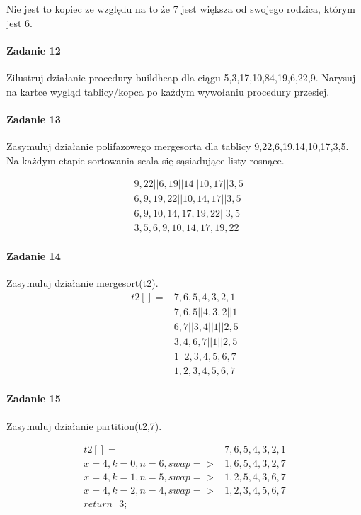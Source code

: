 \documentclass[18pt]{extarticle}
\begin{document}
Nie jest to kopiec ze względu na to że 7 jest większa od swojego rodzica, którym jest 6. \\ 

\paragraph{Zadanie 12} Zilustruj działanie procedury buildheap dla ciągu {5,3,17,10,84,19,6,22,9}. Narysuj na kartce wygląd tablicy/kopca po każdym wywołaniu procedury przesiej.

\paragraph{Zadanie 13} Zasymuluj działanie polifazowego mergesorta dla tablicy {9,22,6,19,14,10,17,3,5}. Na każdym etapie sortowania scala się sąsiadujące listy rosnące.


\begin{align*}
    &{9,22 || 6,19 || 14 || 10,17 || 3,5} \\
    &{6,9,19,22 || 10,14,17 || 3,5} \\
    &{6,9,10,14,17,19,22 || 3,5} \\
    &{3,5,6,9,10,14,17,19,22}
\end{align*}

\paragraph{Zadanie 14} Zasymuluj działanie mergesort(t2).
\begin{align*}
    t2[]=&{7,6,5,4,3,2,1} \\
    &{7,6,5 || 4,3,2 || 1} \\
    &{6,7 || 3,4 || 1 || 2,5} \\
    &{3,4,6,7 || 1 || 2,5} \\
    &{1 || 2,3,4,5,6,7} \\
    &{1,2,3,4,5,6,7}
\end{align*}


\paragraph{Zadanie 15} Zasymuluj działanie partition(t2,7).

\begin{align*}
    t2[]=&{7,6,5,4,3,2,1} \\
    x=4, k=0, n=6, swap =>
    &{1,6,5,4,3,2,7} \\
    x=4, k=1, n=5, swap =>
    &{1,2,5,4,3,6,7} \\
    x=4, k=2, n=4, swap =>
    &{1,2,3,4,5,6,7} \\
    return\text{ }3;
\end{align*}
\end{document}
